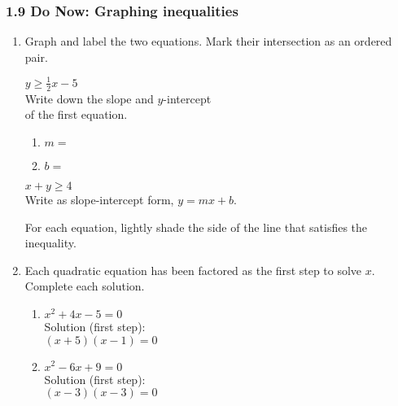 \documentclass[12pt, twoside]{article}
\begin{document}
\subsubsection*{1.9 Do Now: Graphing inequalities}
\begin{enumerate}
  \item Graph and label the two equations. Mark their intersection as an ordered pair.

  \begin{multicols}{2}
    $y \geq \frac{1}{2}x-5$ \\[0.25cm]
    Write down the slope and $y$-intercept\\ of the first equation.
    \begin{enumerate}
      \item $m=$ \bigskip
      \item $b=$
    \end{enumerate}
    \columnbreak
    $x+y \geq 4$ \\[0.5cm]
        Write as slope-intercept form, $y=mx+b$.
    \end{multicols}

  \begin{center} %
  \end{center}

For each equation, lightly shade the side of the line that satisfies the inequality.\\

\newpage
\item Each quadratic equation has been factored as the first step to solve $x$. Complete each solution.
\begin{multicols}{2}
  \begin{enumerate}[itemsep=5cm]
    \item $x^2 + 4x - 5 = 0$ \\[0.5cm]
      Solution (first step): \\
      $(x + 5)(x - 1) = 0$
    \item $x^2 - 6x + 9 = 0$ \\[0.5cm]
      Solution (first step): \\
      $(x - 3)(x - 3) = 0$
    \end{enumerate}
    \end{multicols} \vspace{2cm}


\end{enumerate}
\end{document}
